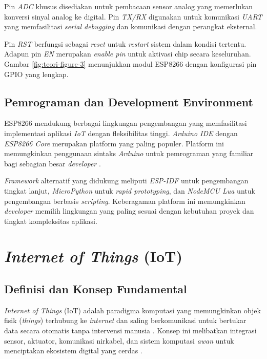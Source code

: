 Pin \textit{ADC} khusus disediakan untuk pembacaan sensor analog yang memerlukan konversi sinyal analog ke digital. Pin \textit{TX/RX} digunakan untuk komunikasi \textit{UART} yang memfasilitasi \textit{serial debugging} dan komunikasi dengan perangkat eksternal. 

Pin \textit{RST} berfungsi sebagai \textit{reset} untuk \textit{restart} sistem dalam kondisi tertentu. Adapun pin \textit{EN} merupakan \textit{enable pin} untuk aktivasi chip secara keseluruhan. Gambar \ref{fig:teori-figure-3} menunjukkan modul ESP8266 dengan konfigurasi pin GPIO yang lengkap.

\subsection{Pemrograman dan Development Environment}
ESP8266 mendukung berbagai lingkungan pengembangan yang memfasilitasi implementasi aplikasi \textit{IoT} dengan fleksibilitas tinggi. \textit{Arduino IDE} dengan \textit{ESP8266 Core} merupakan platform yang paling populer. Platform ini memungkinkan penggunaan sintaks \textit{Arduino} untuk pemrograman yang familiar bagi sebagian besar \textit{developer} \citep{monk2016programming}. 

\textit{Framework} alternatif yang didukung meliputi \textit{ESP-IDF} untuk pengembangan tingkat lanjut, \textit{MicroPython} untuk \textit{rapid prototyping}, dan \textit{NodeMCU Lua} untuk pengembangan berbasis \textit{scripting}. Keberagaman platform ini memungkinkan \textit{developer} memilih lingkungan yang paling sesuai dengan kebutuhan proyek dan tingkat kompleksitas aplikasi.

\section{\textit{Internet of Things} (IoT)}

\subsection{Definisi dan Konsep Fundamental}
\textit{Internet of Things} (IoT) adalah paradigma komputasi yang memungkinkan objek fisik (\textit{things}) terhubung ke \textit{internet} dan saling berkomunikasi untuk bertukar data secara otomatis tanpa intervensi manusia \citep{ashton2009internet}. Konsep ini melibatkan integrasi sensor, aktuator, komunikasi nirkabel, dan sistem komputasi \textit{awan} untuk menciptakan ekosistem digital yang cerdas \citep{ray2018survey}. 

